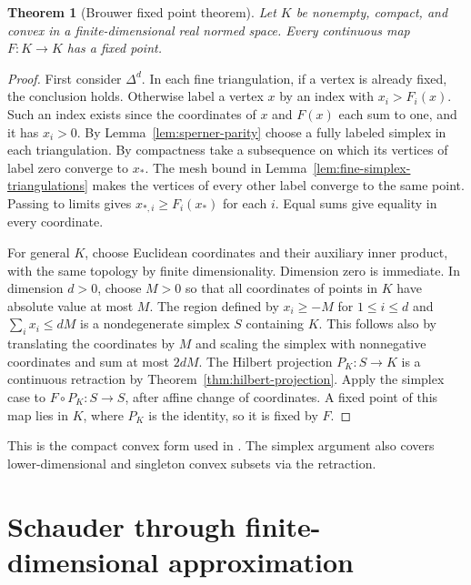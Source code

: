 \documentclass[11pt,oneside,openany]{book}
\theoremstyle{plain}
\newtheorem{theorem}{Theorem}[chapter]
\theoremstyle{definition}
\theoremstyle{remark}
\begin{document}
\begin{theorem}[Brouwer fixed point theorem]
\label{thm:brouwer-compact-convex}
Let \(K\) be nonempty, compact, and convex in a
finite-dimensional real normed space. Every continuous
map \(F:K\to K\) has a fixed point.
\end{theorem}
\begin{proof}
First consider \(\Delta^d\). In each fine triangulation,
if a vertex is already fixed, the conclusion holds.
Otherwise label a vertex \(x\) by an index with \(x_i>F_i(x)\).
Such an index exists since the coordinates of \(x\) and
\(F(x)\) each sum to one, and it has \(x_i>0\).
By Lemma~\ref{lem:sperner-parity} choose a fully labeled simplex
in each triangulation. By compactness take a subsequence on
which its vertices of label zero converge to \(x_*\).
The mesh bound in Lemma~\ref{lem:fine-simplex-triangulations}
makes the vertices of every other label converge to the
same point. Passing to limits gives \(x_{*,i}\ge F_i(x_*)\)
for each \(i\). Equal sums give equality in every coordinate.

For general \(K\), choose Euclidean coordinates and their
auxiliary inner product, with the same topology by finite
dimensionality. Dimension zero is immediate. In dimension
\(d>0\), choose \(M>0\) so that all coordinates of points
in \(K\) have absolute value at most \(M\).
The region defined by \(x_i\ge-M\) for \(1\le i\le d\)
and \(\sum_i x_i\le dM\) is a nondegenerate simplex \(S\)
containing \(K\). This follows also by translating the
coordinates by \(M\) and scaling the simplex with
nonnegative coordinates and sum at most \(2dM\).
The Hilbert projection \(P_K:S\to K\) is a continuous
retraction by Theorem~\ref{thm:hilbert-projection}.
Apply the simplex case to \(F\circ P_K:S\to S\),
after affine change of coordinates. A fixed point of
this map lies in \(K\), where \(P_K\) is the identity,
so it is fixed by \(F\).
\end{proof}

This is the compact convex form used in
\cite[Exercise 6.26]{Brezis}. The simplex argument also covers
lower-dimensional and singleton convex subsets via the retraction.

\section{Schauder through finite-dimensional approximation}
\label{v10-02}
\end{document}
